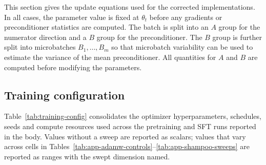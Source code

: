 \documentclass{article}
\begin{document}
This section gives the update equations used for the corrected implementations. In all cases, the parameter value is fixed at $\theta_t$ before any gradients or preconditioner statistics are computed. The batch is split into an $A$ group for the numerator direction and a $B$ group for the preconditioner. The $B$ group is further split into microbatches $B_1,\ldots,B_m$ so that microbatch variability can be used to estimate the variance of the mean preconditioner. All quantities for $A$ and $B$ are computed before modifying the parameters.

\subsection{Training configuration}
\label{app:training-config}

Table~\ref{tab:training-config} consolidates the optimizer hyperparameters, schedules, seeds and compute resources used across the pretraining and SFT runs reported in the body. Values without a sweep are reported as scalars; values that vary across cells in Tables~\ref{tab:app-adamw-controls}--\ref{tab:app-shampoo-sweeps} are reported as ranges with the swept dimension named.
\end{document}
